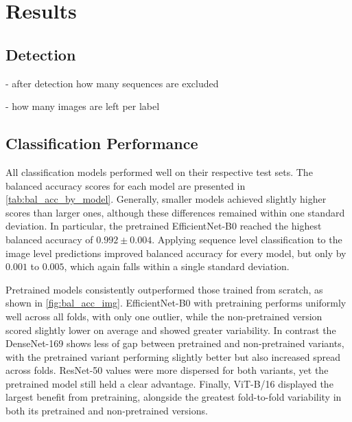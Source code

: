

\section{Results}
\label{results}

    \subsection{Detection}

    - after detection how many sequences are excluded

    - how many images are left per label

    

    \subsection{Classification Performance}

    All classification models performed well on their respective test sets.
    The balanced accuracy scores for each model are presented in \autoref{tab:bal_acc_by_model}.
    Generally, smaller models achieved slightly higher scores than larger ones, although these differences remained within one standard deviation.
    In particular, the pretrained EfficientNet-B0 reached the highest balanced accuracy of \(0.992\pm0.004\).
    Applying sequence level classification to the image level predictions improved balanced accuracy for every model, but only by \(0.001\) to \(0.005\), which again falls within a single standard deviation.

    Pretrained models consistently outperformed those trained from scratch, as shown in \autoref{fig:bal_acc_img}.
    EfficientNet-B0 with pretraining performs uniformly well across all folds, with only one outlier, while the non-pretrained version scored slightly lower on average and showed greater variability.
    In contrast the DenseNet-169 shows less of gap between pretrained and non-pretrained variants, with the pretrained variant performing slightly better but also increased spread across folds.
    ResNet-50 values were more dispersed for both variants, yet the pretrained model still held a clear advantage. 
    Finally, ViT-B/16 displayed the largest benefit from pretraining, alongside the greatest fold-to-fold variability in both its pretrained and non-pretrained versions.

